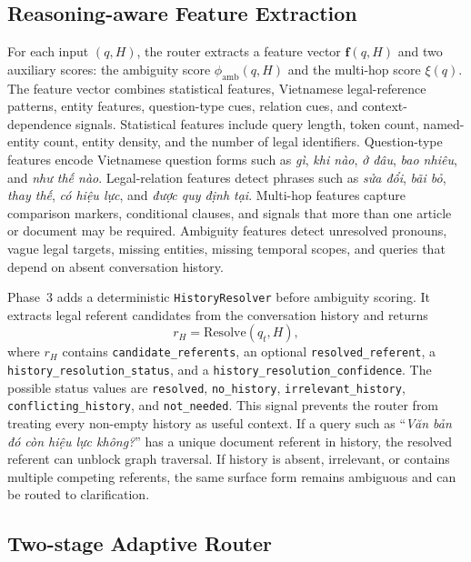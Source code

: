 \documentclass[11pt,twocolumn]{article}
\begin{document}
\subsection{Reasoning-aware Feature Extraction}
\label{subsec:feature_extraction}

For each input $(q,H)$, the router extracts a feature vector
$\mathbf{f}(q,H)$ and two auxiliary scores: the ambiguity
score $\phi_{\mathrm{amb}}(q,H)$ and the multi-hop score
$\xi(q)$. The feature vector combines statistical features,
Vietnamese legal-reference patterns, entity features,
question-type cues, relation cues, and context-dependence
signals. Statistical features include query length, token
count, named-entity count, entity density, and the number of
legal identifiers. Question-type features encode Vietnamese
question forms such as \textit{gì}, \textit{khi nào},
\textit{ở đâu}, \textit{bao nhiêu}, and \textit{như thế nào}.
Legal-relation features detect phrases such as \textit{sửa
đổi}, \textit{bãi bỏ}, \textit{thay thế}, \textit{có hiệu
lực}, and \textit{được quy định tại}. Multi-hop features
capture comparison markers, conditional clauses, and signals
that more than one article or document may be required.
Ambiguity features detect unresolved pronouns, vague legal
targets, missing entities, missing temporal scopes, and
queries that depend on absent conversation history.

Phase~3 adds a deterministic \texttt{HistoryResolver} before
ambiguity scoring. It extracts legal referent candidates from
the conversation history and returns
\begin{equation}
r_H=\mathrm{Resolve}(q_t,H),
\label{eq:history_resolver}
\end{equation}
where $r_H$ contains \texttt{candidate\_referents}, an optional
\texttt{resolved\_referent}, a
\texttt{history\_resolution\_status}, and a
\texttt{history\_resolution\_confidence}. The possible status
values are \texttt{resolved}, \texttt{no\_history},
\texttt{irrelevant\_history}, \texttt{conflicting\_history},
and \texttt{not\_needed}. This signal prevents the router from
treating every non-empty history as useful context. If a
query such as ``\textit{Văn bản đó còn hiệu lực không?}''
has a unique document referent in history, the resolved
referent can unblock graph traversal. If history is absent,
irrelevant, or contains multiple competing referents, the same
surface form remains ambiguous and can be routed to
clarification.

\subsection{Two-stage Adaptive Router}
\label{subsec:two_stage_router}
\end{document}
